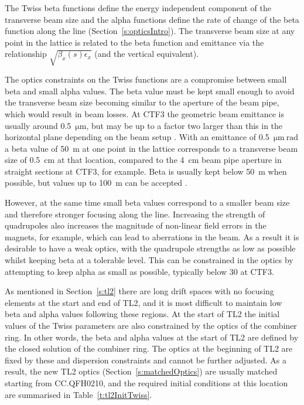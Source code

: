 
The Twiss beta functions define the energy independent component of the transverse beam size and the alpha functions define the rate of change of the beta function along the line (Section~\ref{s:opticsIntro}). The transverse beam size at any point in the lattice is related to the beta function and emittance via the relationship \(\sqrt{\beta_x(s)\epsilon_x}\) (and the vertical equivalent). 

The optics constraints on the Twiss functions are a compromise between small beta and small alpha values. The beta value must be kept small enough to avoid the transverse beam size becoming similar to the aperture of the beam pipe, which would result in beam losses. At CTF3 the geometric beam emittance is usually around 0.5~\(\mathrm{\mu m}\), but may be up to a factor two larger than this in the horizontal plane depending on the beam setup \cite{davideThesis}. With an emittance of 0.5~\(\mathrm{\mu m~rad}\) a beta value of 50~m at one point in the lattice corresponds to a transverse beam size of 0.5~cm at that location, compared to the 4~cm beam pipe aperture in straight sections at CTF3, for example. Beta is usually kept below 50~m when possible, but values up to 100~m can be accepted \cite{piotrPriv}. 

However, at the same time small beta values correspond to a smaller beam size and therefore stronger focusing along the line. Increasing the strength of quadrupoles also increases the magnitude of non-linear field errors in the magnets, for example, which can lead to aberrations in the beam. As a result it is desirable to have a weak optics, with the quadrupole strengths as low as possible whilst keeping beta at a tolerable level. This can be constrained in the optics by attempting to keep alpha as small as possible, typically below 30 at CTF3.

As mentioned in Section~\ref{s:tl2} there are long drift spaces with no focusing elements at the start and end of TL2, and it is most difficult to maintain low beta and alpha values following these regions. At the start of TL2 the initial values of the Twiss parameters are also constrained by the optics of the combiner ring. In other words, the beta and alpha values at the start of TL2 are defined by the closed solution of the combiner ring. The optics at the beginning of TL2 are fixed by these and dispersion constraints and cannot be further adjusted. As a result, the new TL2 optics (Section~\ref{s:matchedOptics}) are usually matched starting from CC.QFH0210, and the required initial conditions at this location are summarised in Table~\ref{t:tl2InitTwiss}.

